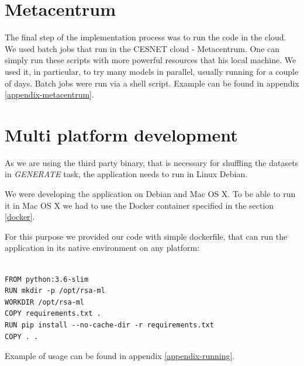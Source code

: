 \section{Metacentrum}

The final step of the implementation process was to run the code in the cloud. We used batch jobs\cite{metacentrum} that run in the CESNET cloud - Metacentrum. One can simply run these scripts with more powerful resources that his local machine. We used it, in particular, to try many models in parallel, usually running for a couple of days. Batch jobs were run via a shell script. Example can be found in appendix \ref{appendix-metacentrum}.

\section{Multi platform development}

As we are using the third party binary, that is necessary for shuffling the datasets in \textit{GENERATE} task, the application needs to run in Linux Debian.

We were developing the application on Debian and Mac OS X. To be able to run it in Mac OS X we had to use the Docker container specified in the section \ref{docker}.

For this purpose we provided our code with simple dockerfile, that can run the application in its native environment on any platform:

\begin{verbatim}

FROM python:3.6-slim
RUN mkdir -p /opt/rsa-ml
WORKDIR /opt/rsa-ml
COPY requirements.txt .
RUN pip install --no-cache-dir -r requirements.txt
COPY . .

\end{verbatim}

\noindent
Example of usage can be found in appendix \ref{appendix-running}.
